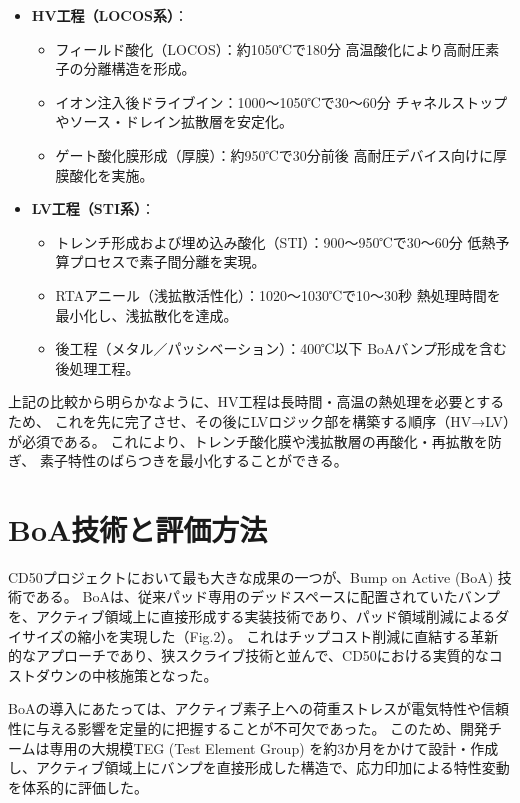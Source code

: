 \documentclass[conference]{IEEEtran}
\begin{document}
\begin{itemize}
  \item \textbf{HV工程（LOCOS系）}：
  \begin{itemize}
    \item フィールド酸化（LOCOS）：約1050℃で180分  
          高温酸化により高耐圧素子の分離構造を形成。
    \item イオン注入後ドライブイン：1000〜1050℃で30〜60分  
          チャネルストップやソース・ドレイン拡散層を安定化。
    \item ゲート酸化膜形成（厚膜）：約950℃で30分前後  
          高耐圧デバイス向けに厚膜酸化を実施。
  \end{itemize}

  \item \textbf{LV工程（STI系）}：
  \begin{itemize}
    \item トレンチ形成および埋め込み酸化（STI）：900〜950℃で30〜60分  
          低熱予算プロセスで素子間分離を実現。
    \item RTAアニール（浅拡散活性化）：1020〜1030℃で10〜30秒  
          熱処理時間を最小化し、浅拡散化を達成。
    \item 後工程（メタル／パッシベーション）：400℃以下  
          BoAバンプ形成を含む後処理工程。
  \end{itemize}
\end{itemize}

上記の比較から明らかなように、HV工程は長時間・高温の熱処理を必要とするため、
これを先に完了させ、その後にLVロジック部を構築する順序（HV→LV）が必須である。
これにより、トレンチ酸化膜や浅拡散層の再酸化・再拡散を防ぎ、
素子特性のばらつきを最小化することができる。

\section{BoA技術と評価方法}
CD50プロジェクトにおいて最も大きな成果の一つが、Bump on Active (BoA) 技術である。  
BoAは、従来パッド専用のデッドスペースに配置されていたバンプを、アクティブ領域上に直接形成する実装技術であり、パッド領域削減によるダイサイズの縮小を実現した（Fig.2）。  
これはチップコスト削減に直結する革新的なアプローチであり、狭スクライブ技術と並んで、CD50における実質的なコストダウンの中核施策となった。

BoAの導入にあたっては、アクティブ素子上への荷重ストレスが電気特性や信頼性に与える影響を定量的に把握することが不可欠であった。  
このため、開発チームは専用の大規模TEG (Test Element Group) を約3か月をかけて設計・作成し、アクティブ領域上にバンプを直接形成した構造で、応力印加による特性変動を体系的に評価した。
\end{document}

